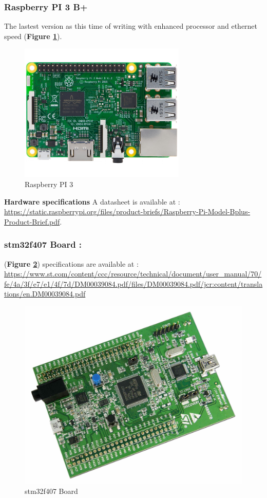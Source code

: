 \subsubsection{Raspberry PI 3 B+}
The lastest version as this time of writing with enhanced processor and ethernet speed (\textbf{Figure \ref{Raspberry PI 3}}).
		\begin{figure}[H]
			\centering
        	\includegraphics[scale=0.32]{img/mean/rpi3.png}
        	\caption{Raspberry PI 3}
        	\label{Raspberry PI 3}
    	\end{figure}
    	
\begin{center}	
\textbf{\color{red}Hardware specifications} 
A datasheet is available at : {\color{blue}\url{https://static.raspberrypi.org/files/product-briefs/Raspberry-Pi-Model-Bplus-Product-Brief.pdf}}.
\end{center}


\subsubsection{stm32f407 Board : } (\textbf{Figure \ref{stm32f407 Board}})  specifications are available at : {\color{blue}\url{https://www.st.com/content/ccc/resource/technical/document/user_manual/70/fe/4a/3f/e7/e1/4f/7d/DM00039084.pdf/files/DM00039084.pdf/jcr:content/translations/en.DM00039084.pdf}}
		\begin{figure}[H]
			\centering
        	\includegraphics[scale=0.08]{img/mean/stm-32.jpg}
        	\caption{stm32f407 Board}
        	\label{stm32f407 Board}
    	\end{figure}


